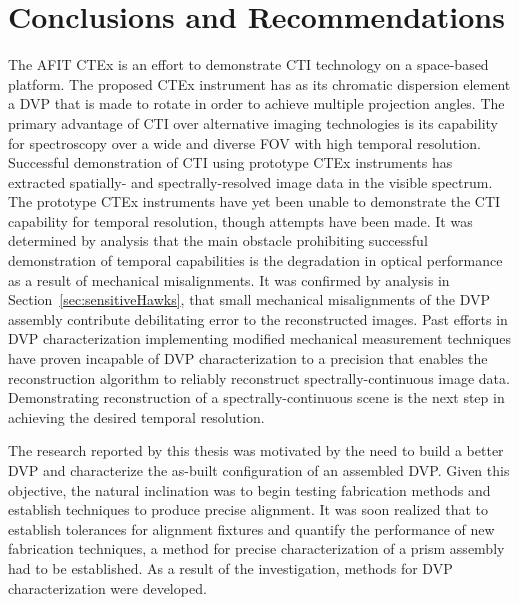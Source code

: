 \chapter{Conclusions and Recommendations}
\label{ch:conclusion}

The \acf{AFIT} \acf{CTEx} is an effort to demonstrate \acf{CTI} technology on a space-based platform. The proposed \ac{CTEx} instrument has as its chromatic dispersion element a \acf{DVP} that is made to rotate in order to achieve multiple projection angles. The primary advantage of \ac{CTI} over alternative imaging technologies is its capability for spectroscopy over a wide and diverse \acf{FOV} with high temporal resolution. Successful demonstration of \ac{CTI} using prototype \ac{CTEx} instruments has extracted spatially- and spectrally-resolved image data in the visible spectrum.  The prototype \ac{CTEx} instruments have yet been unable to demonstrate the \ac{CTI} capability for temporal resolution, though attempts have been made. It was determined by analysis that the main obstacle prohibiting successful demonstration of temporal capabilities is the degradation in optical performance as a result of mechanical misalignments. It was confirmed by analysis in Section~\ref{sec:sensitiveHawks}, that small mechanical misalignments of the \ac{DVP} assembly contribute debilitating error to the reconstructed images. Past efforts in \ac{DVP} characterization implementing modified mechanical measurement techniques have proven incapable of \ac{DVP} characterization to a precision that enables the reconstruction algorithm to reliably reconstruct spectrally-continuous image data. Demonstrating reconstruction of a spectrally-continuous scene is the next step in achieving the desired temporal resolution.


The research reported by this thesis was motivated by the need to build a better \ac{DVP} and characterize the as-built configuration of an assembled \ac{DVP}. Given this objective, the natural inclination was to begin testing fabrication methods and establish techniques to produce precise alignment. It was soon realized that to establish tolerances for alignment fixtures and quantify the performance of new fabrication techniques, a method for precise characterization of a prism assembly had to be established. As a result of the investigation, methods for \ac{DVP} characterization were developed.

